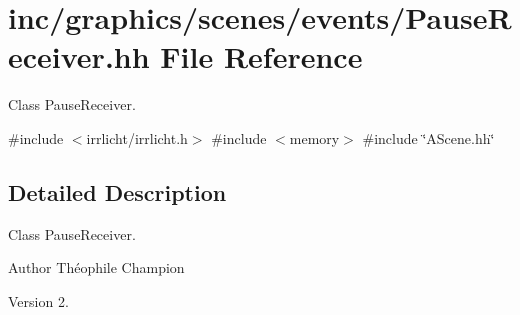 \hypertarget{PauseReceiver_8hh}{}\section{inc/graphics/scenes/events/\+Pause\+Receiver.hh File Reference}
\label{PauseReceiver_8hh}


Class Pause\+Receiver.  


{\ttfamily \#include $<$irrlicht/irrlicht.\+h$>$}\newline
{\ttfamily \#include $<$memory$>$}\newline
{\ttfamily \#include \char`\"{}A\+Scene.\+hh\char`\"{}}\newline


\subsection{Detailed Description}
Class Pause\+Receiver. 

\begin{DoxyAuthor}{Author}
Théophile Champion 
\end{DoxyAuthor}
\begin{DoxyVersion}{Version}
2. 
\end{DoxyVersion}
